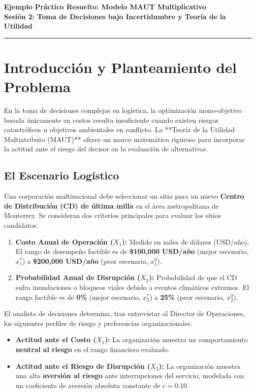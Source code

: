 \documentclass[11pt, letterpaper]{article}
\begin{document}
\begin{center}
    {\LARGE\bfseries\color{UANLblue} Ejemplo Práctico Resuelto: Modelo MAUT Multiplicativo} \\[0.3cm]
    {\large\bfseries\color{FIMEgreen} Sesión 2: Toma de Decisiones bajo Incertidumbre y Teoría de la Utilidad} \\[0.2cm]
    \rule{\linewidth}{1.5pt}
\end{center}

\section{Introducción y Planteamiento del Problema}

En la toma de decisiones complejas en logística, la optimización mono-objetivo basada únicamente en costos resulta insuficiente cuando existen riesgos catastróficos u objetivos ambientales en conflicto. La **Teoría de la Utilidad Multiatributo (MAUT)** ofrece un marco matemático riguroso para incorporar la actitud ante el riesgo del decisor en la evaluación de alternativas.

\subsection{El Escenario Logístico}
Una corporación multinacional debe seleccionar un sitio para un nuevo \textbf{Centro de Distribución (CD) de última milla} en el área metropolitana de Monterrey. Se consideran dos criterios principales para evaluar los sitios candidatos:
\begin{enumerate}
    \item \textbf{Costo Anual de Operación ($X_1$):} Medido en miles de dólares (USD/año). El rango de desempeño factible es de \textbf{\$100,000 USD/año} (mejor escenario, $x_1^*$) a \textbf{\$200,000 USD/año} (peor escenario, $x_1^0$).
    \item \textbf{Probabilidad Anual de Disrupción ($X_2$):} Probabilidad de que el CD sufra inundaciones o bloqueos viales debido a eventos climáticos extremos. El rango factible es de \textbf{0\%} (mejor escenario, $x_2^*$) a \textbf{25\%} (peor escenario, $x_2^0$).
\end{enumerate}

El analista de decisiones determina, tras entrevistar al Director de Operaciones, los siguientes perfiles de riesgo y preferencias organizacionales:
\begin{itemize}
    \item \textbf{Actitud ante el Costo ($X_1$):} La organización muestra un comportamiento \textbf{neutral al riesgo} en el rango financiero evaluado.
    \item \textbf{Actitud ante el Riesgo de Disrupción ($X_2$):} La organización muestra una alta \textbf{aversión al riesgo} ante interrupciones del servicio, modelada con un coeficiente de aversión absoluta constante de $c = 0.10$.
\end{itemize}
\end{document}
